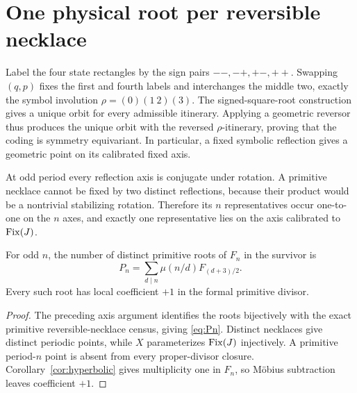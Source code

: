 \section{One physical root per reversible necklace}

Label the four state rectangles by the sign pairs
$--,-+,+-,++$.  Swapping $(q,p)$ fixes the first and fourth labels and
interchanges the middle two, exactly the symbol involution
$\rho=(0)(1\ 2)(3)$.  The signed-square-root construction gives a unique
orbit for every admissible itinerary.  Applying a geometric reversor thus
produces the unique orbit with the reversed $\rho$-itinerary, proving that
the coding is symmetry equivariant.  In particular, a fixed symbolic
reflection gives a geometric point on its calibrated fixed axis.

At odd period every reflection axis is conjugate under rotation.  A primitive
necklace cannot be fixed by two distinct reflections, because their product
would be a nontrivial stabilizing rotation.  Therefore its $n$ representatives
occur one-to-one on the $n$ axes, and exactly one representative lies on the
axis calibrated to $\operatorname{Fix}(J)$.

\begin{proposition}\label{prop:incidence}
For odd $n$, the number of distinct primitive roots of $F_n$ in the survivor
is
\begin{equation}\label{eq:Pn}
P_n=\sum_{d\mid n}\mu(n/d)F_{(d+3)/2}.
\end{equation}
Every such root has local coefficient $+1$ in the formal primitive divisor.
\end{proposition}

\begin{proof}
The preceding axis argument identifies the roots bijectively with the exact
primitive reversible-necklace census, giving \eqref{eq:Pn}.  Distinct
necklaces give distinct periodic points, while $X$ parameterizes $\operatorname{Fix}(J)$
injectively.  A primitive period-$n$ point is absent from every proper-divisor
closure.  Corollary~\ref{cor:hyperbolic} gives multiplicity one in $F_n$, so
M\"obius subtraction leaves coefficient $+1$.
\end{proof}
